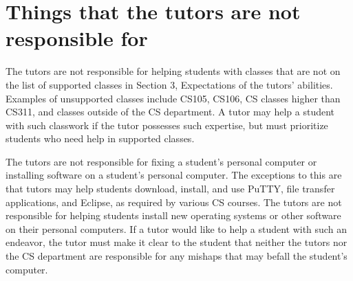 \documentclass[12pt]{article}
\begin{document}
\section{Things that the tutors are not responsible for}
The tutors are not responsible for helping students with classes that
are not on the list of supported classes in Section 3, Expectations 
of the tutors' abilities. Examples of unsupported classes include 
CS105, CS106, CS classes higher than CS311, and classes outside of 
the CS department. A tutor may help a student with such classwork 
if the tutor possesses such expertise, but must prioritize students 
who need help in supported classes.

The tutors are not responsible for fixing a student's personal computer or 
installing software on a student's personal computer. The exceptions to 
this are that tutors may help students download, install, and use PuTTY,
file transfer applications, and Eclipse, as required by various CS courses.
The tutors are not responsible for helping students install new operating
systems or other software on their personal computers. If a tutor would
like to help a student with such an endeavor, the tutor must make it 
clear to the student that neither the tutors nor the CS department
are responsible for any mishaps that may befall the student's computer.
\end{document}
